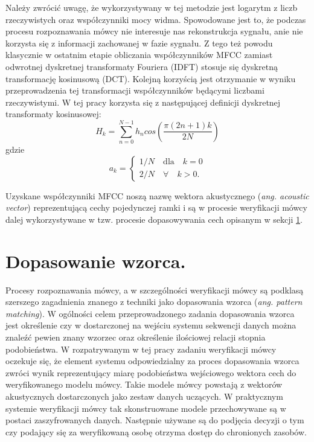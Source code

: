 Należy zwrócić uwagę, że wykorzystywany w tej metodzie jest logarytm z liczb rzeczywistych oraz współczynniki mocy widma. Spowodowane jest to, że podczas procesu rozpoznawania mówcy nie interesuje nas rekonstrukcja sygnału, anie nie korzysta się z informacji zachowanej w fazie sygnału. Z tego też powodu klasycznie w ostatnim etapie obliczania współczynników MFCC zamiast odwrotnej dyskretnej transformaty Fouriera (IDFT) stosuje się dyskretną transformację kosinusową (DCT). Kolejną korzyścią jest otrzymanie w wyniku przeprowadzenia tej transformacji współczynników będącymi liczbami rzeczywistymi. W tej pracy korzysta się z następującej definicji dyskretnej transformaty kosinusowej:
\begin{equation}
    H_k = \sum_{n=0}^{N-1} h_ncos\left(\frac{\pi (2n+1)k}{2N}\right)
\end{equation}
gdzie
\begin{equation}
    a_k = 
    \begin{cases}
        1/N \quad \text{dla}\quad k=0 \\
        2/N \quad \forall \quad k>0.
    \end{cases}
\end{equation}

Uzyskane współczynniki MFCC noszą nazwę wektora akustycznego (\textit{ang. acoustic vector}) reprezentującą cechy pojedynczej ramki i są w procesie weryfikacji mówcy dalej wykorzystywane w tzw. procesie dopasowywania cech opisanym w sekcji \ref{featurematching}.

\section{Dopasowanie wzorca.}
\label{featurematching}

Procesy rozpoznawania mówcy, a w szczególności weryfikacji mówcy są podklasą szerszego zagadnienia znanego z techniki jako dopasowania wzorca (\textit{ang. pattern matching}). W ogólności celem przeprowadzonego zadania dopasowania wzorca jest określenie czy w dostarczonej na wejściu systemu sekwencji danych można znaleźć pewien znany wzorzec oraz określenie ilościowej relacji stopnia podobieństwa. W rozpatrywanym w tej pracy zadaniu weryfikacji mówcy oczekuje się, że element systemu odpowiedzialny za proces dopasowania wzorca zwróci wynik reprezentujący miarę podobieństwa wejściowego wektora cech do weryfikowanego modelu mówcy. Takie modele mówcy powstają z wektorów akustycznych dostarczonych jako zestaw danych uczących. W praktycznym systemie weryfikacji mówcy tak skonstruowane modele przechowywane są w postaci zaszyfrowanych danych. Następnie używane są do podjęcia decyzji o tym czy podający się za weryfikowaną osobę otrzyma dostęp do chronionych zasobów.

